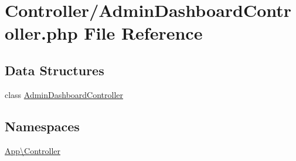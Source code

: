 \hypertarget{_admin_dashboard_controller_8php}{}\section{Controller/\+Admin\+Dashboard\+Controller.php File Reference}
\label{_admin_dashboard_controller_8php}
\subsection*{Data Structures}
\begin{DoxyCompactItemize}
\item 
class \mbox{\hyperlink{class_app_1_1_controller_1_1_admin_dashboard_controller}{Admin\+Dashboard\+Controller}}
\end{DoxyCompactItemize}
\subsection*{Namespaces}
\begin{DoxyCompactItemize}
\item 
 \mbox{\hyperlink{namespace_app_1_1_controller}{App\textbackslash{}\+Controller}}
\end{DoxyCompactItemize}
